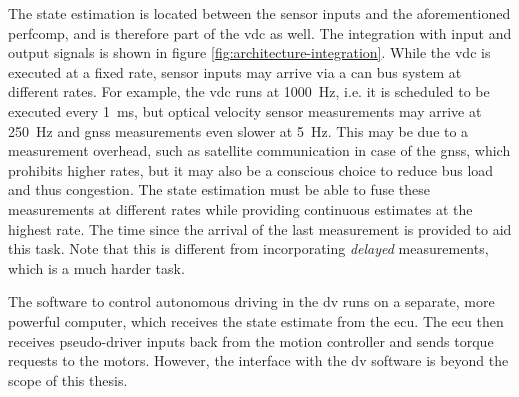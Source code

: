 The state estimation is located between the sensor inputs and the aforementioned \gls{perfcomp}, and is therefore part of the \gls{vdc} as well. The integration with input and output signals is shown in figure \ref{fig:architecture-integration}. While the \gls{vdc} is executed at a fixed rate, sensor inputs may arrive via a \gls{can} bus system at different rates. For example, the \gls{vdc} runs at \SI{1000}{\hertz}, i.e. it is scheduled to be executed every \SI{1}{\milli\second}, but optical velocity sensor measurements may arrive at \SI{250}{\hertz} and \gls{gnss} measurements even slower at \SI{5}{\hertz}. This may be due to a measurement overhead, such as satellite communication in case of the \gls{gnss}, which prohibits higher rates, but it may also be a conscious choice to reduce bus load and thus congestion. The state estimation must be able to fuse these measurements at different rates while providing continuous estimates at the highest rate. The time since the arrival of the last measurement is provided to aid this task. Note that this is different from incorporating \textit{delayed} measurements, which is a much harder task.

The software to control autonomous driving in the \gls{dv} runs on a separate, more powerful computer, which receives the state estimate from the \gls{ecu}. The \gls{ecu} then receives pseudo-driver inputs back from the motion controller and sends torque requests to the motors. However, the interface with the \gls{dv} software is beyond the scope of this thesis.
